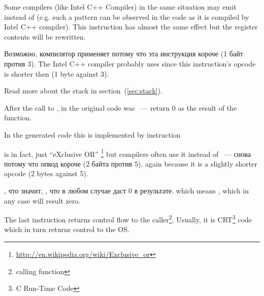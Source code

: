 {Some compilers (like Intel C++ Compiler) in the same situation may emit  
instead of \ADD (e.g. such a pattern can be observed in the \oracle{} code as it is compiled by Intel C++ compiler).
This instruction has almost the same effect but the \ECX register contents will be rewritten.}

\IFRU
{Возможно, компилятор применяет  потому что эта инструкция короче (1 байт против 3).}
{The Intel C++ compiler probably uses  since this instruction's opcode is shorter then 
 (1 byte against 3).}

{Read more about the stack in section}~(\ref{sec:stack}).

{After the call to \printf, in the original \CCpp code was  ~--- 
return $0$ as the result of the \main function.}

{In the generated code this is implemented by instruction}  

{\XOR is in fact, just ``eXclusive OR''}
\footnote{\url{http://en.wikipedia.org/wiki/Exclusive_or}}
{but compilers often use it instead of}
 ~--- 
\IFRU
{снова потому что опкод короче (2 байта против 5).}
{again because it is a slightly shorter opcode (2 bytes against 5).}

, 
\IFRU
{что значит, , что в любом случае даст 0 в результате.}
{which means , which in any case will result zero.}

{The last instruction \RET returns control flow to the caller\footnote{calling function}.
Usually, it is \CCpp CRT\footnote{C Run-Time Code} code which in turn
returns control to the \ac{OS}.}

